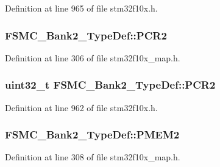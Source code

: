 Definition at line 965 of file stm32f10x.\+h.

\subsubsection[{\texorpdfstring{P\+C\+R2}{PCR2}}]{ F\+S\+M\+C\+\_\+\+Bank2\+\_\+\+Type\+Def\+::\+P\+C\+R2}\hypertarget{struct_f_s_m_c___bank2___type_def_a771b1042772a05bf3838eae862598ff5}{}\label{struct_f_s_m_c___bank2___type_def_a771b1042772a05bf3838eae862598ff5}


Definition at line 306 of file stm32f10x\+\_\+map.\+h.

\subsubsection[{\texorpdfstring{P\+C\+R2}{PCR2}}]{ {\bf uint32\+\_\+t} F\+S\+M\+C\+\_\+\+Bank2\+\_\+\+Type\+Def\+::\+P\+C\+R2}\hypertarget{struct_f_s_m_c___bank2___type_def_ad1eabc89a4eadb5cc6a42c1e39a39ff8}{}\label{struct_f_s_m_c___bank2___type_def_ad1eabc89a4eadb5cc6a42c1e39a39ff8}


Definition at line 962 of file stm32f10x.\+h.

\subsubsection[{\texorpdfstring{P\+M\+E\+M2}{PMEM2}}]{ F\+S\+M\+C\+\_\+\+Bank2\+\_\+\+Type\+Def\+::\+P\+M\+E\+M2}\hypertarget{struct_f_s_m_c___bank2___type_def_a15b10ce81d0cb86a38c1079ce02ba0ee}{}\label{struct_f_s_m_c___bank2___type_def_a15b10ce81d0cb86a38c1079ce02ba0ee}


Definition at line 308 of file stm32f10x\+\_\+map.\+h.

